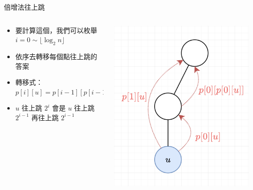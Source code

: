 \documentclass[aspectratio=169]{beamer}
\begin{document}
    \begin{frame}{倍增法往上跳}
        \begin{columns}
            \begin{column}{0.65 \textwidth}
                \begin{itemize}
                    \item 要計算這個，我們可以枚舉  $i = 0 \sim \lfloor \log_2 n \rfloor$
                    \item 依序去轉移每個點往上跳的答案
                    \item 轉移式：$p[i][u] = p[i-1][p[i-1][u]]$
                    \item $u$ 往上跳 $2^i$ 會是 $u$ 往上跳 $2^{i-1}$ 再往上跳 $2^{i-1}$
                \end{itemize}
            \end{column}
            \begin{column}{0.4 \textwidth}
                \begin{center}
                    \includegraphics[scale=0.3]{images/binary_lifting_transition.png}
                \end{center}
            \end{column}
        \end{columns}
    \end{frame}
    
\end{document}
